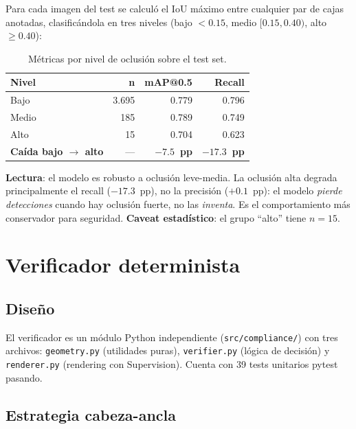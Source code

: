 \documentclass[conference]{IEEEtran}
\begin{document}
Para cada imagen del test se calculó el IoU máximo entre cualquier
par de cajas anotadas, clasificándola en tres niveles (bajo $<0.15$,
medio $[0.15,0.40)$, alto $\geq0.40$):

\begin{table}[h]
\centering
\caption{Métricas por nivel de oclusión sobre el test set.}
\label{tab:occ}
\renewcommand{\arraystretch}{1.15}
\begin{tabular}{l r r r}
\toprule
\textbf{Nivel} & \textbf{n} & \textbf{mAP@0.5} & \textbf{Recall} \\
\midrule
Bajo & 3.695 & 0.779 & 0.796 \\
Medio & 185 & 0.789 & 0.749 \\
Alto & 15 & 0.704 & 0.623 \\
\midrule
\textbf{Caída bajo $\to$ alto} & — & \textbf{$-7.5$~pp} & \textbf{$-17.3$~pp} \\
\bottomrule
\end{tabular}
\end{table}

\textbf{Lectura}: el modelo es robusto a oclusión leve-media. La
oclusión alta degrada principalmente el recall ($-17.3$~pp), no la
precisión ($+0.1$~pp): el modelo \emph{pierde detecciones} cuando
hay oclusión fuerte, no las \emph{inventa}. Es el comportamiento
más conservador para seguridad. \textbf{Caveat estadístico}: el
grupo ``alto'' tiene $n=15$.

\section{Verificador determinista}

\subsection{Diseño}

El verificador es un módulo Python independiente
(\texttt{src/compliance/}) con tres archivos: \texttt{geometry.py}
(utilidades puras), \texttt{verifier.py} (lógica de decisión) y
\texttt{renderer.py} (rendering con Supervision). Cuenta con 39
tests unitarios pytest pasando.

\subsection{Estrategia cabeza-ancla}
\end{document}

